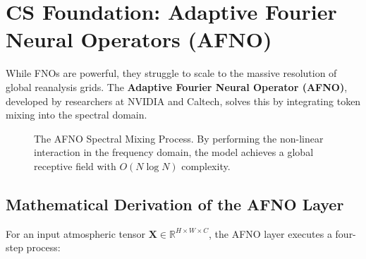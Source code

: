 \section{CS Foundation: Adaptive Fourier Neural Operators (AFNO)}

While FNOs are powerful, they struggle to scale to the massive resolution of global reanalysis grids. The \textbf{Adaptive Fourier Neural Operator (AFNO)}, developed by researchers at NVIDIA and Caltech, solves this by integrating token mixing into the spectral domain. 

\begin{figure}[H]
\centering
{}
\caption{The AFNO Spectral Mixing Process. By performing the non-linear interaction in the frequency domain, the model achieves a global receptive field with $O(N \log N)$ complexity.}
\label{fig:afno_tikz}
\end{figure}

\subsection{Mathematical Derivation of the AFNO Layer}
For an input atmospheric tensor $\mathbf{X} \in \mathbb{R}^{H \times W \times C}$, the AFNO layer executes a four-step process:

